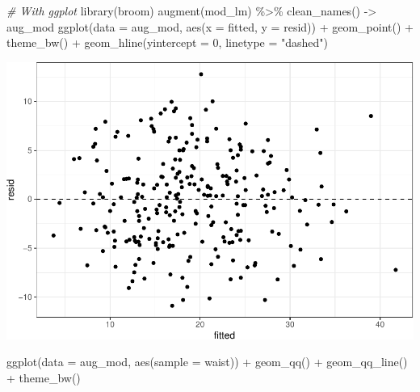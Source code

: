 \documentclass[
]{article}
\newenvironment{Shaded}{\begin{snugshade}}{\end{snugshade}}
\newcommand{\AttributeTok}[1]{\textcolor[rgb]{0.77,0.63,0.00}{#1}}
\newcommand{\CommentTok}[1]{\textcolor[rgb]{0.56,0.35,0.01}{\textit{#1}}}
\newcommand{\DecValTok}[1]{\textcolor[rgb]{0.00,0.00,0.81}{#1}}
\newcommand{\FunctionTok}[1]{\textcolor[rgb]{0.00,0.00,0.00}{#1}}
\newcommand{\NormalTok}[1]{#1}
\newcommand{\OtherTok}[1]{\textcolor[rgb]{0.56,0.35,0.01}{#1}}
\newcommand{\SpecialCharTok}[1]{\textcolor[rgb]{0.00,0.00,0.00}{#1}}
\newcommand{\StringTok}[1]{\textcolor[rgb]{0.31,0.60,0.02}{#1}}
\begin{document}
\begin{Shaded}
\begin{Highlighting}[]
\CommentTok{\# With ggplot}
\FunctionTok{library}\NormalTok{(broom)}
\FunctionTok{augment}\NormalTok{(mod\_lm) }\SpecialCharTok{\%\textgreater{}\%} 
  \FunctionTok{clean\_names}\NormalTok{() }\OtherTok{{-}\textgreater{}}\NormalTok{ aug\_mod}
\FunctionTok{ggplot}\NormalTok{(}\AttributeTok{data =}\NormalTok{ aug\_mod, }\FunctionTok{aes}\NormalTok{(}\AttributeTok{x =}\NormalTok{ fitted, }\AttributeTok{y =}\NormalTok{ resid)) }\SpecialCharTok{+} 
  \FunctionTok{geom\_point}\NormalTok{() }\SpecialCharTok{+}
  \FunctionTok{theme\_bw}\NormalTok{() }\SpecialCharTok{+} 
  \FunctionTok{geom\_hline}\NormalTok{(}\AttributeTok{yintercept =} \DecValTok{0}\NormalTok{, }\AttributeTok{linetype =} \StringTok{"dashed"}\NormalTok{)}
\end{Highlighting}
\end{Shaded}

\begin{center}\includegraphics{CHAP23_files/figure-latex/unnamed-chunk-4-1} \end{center}

\begin{Shaded}
\begin{Highlighting}[]
\FunctionTok{ggplot}\NormalTok{(}\AttributeTok{data =}\NormalTok{ aug\_mod, }\FunctionTok{aes}\NormalTok{(}\AttributeTok{sample =}\NormalTok{ waist)) }\SpecialCharTok{+} 
  \FunctionTok{geom\_qq}\NormalTok{() }\SpecialCharTok{+}
  \FunctionTok{geom\_qq\_line}\NormalTok{() }\SpecialCharTok{+}
  \FunctionTok{theme\_bw}\NormalTok{() }
\end{Highlighting}
\end{Shaded}
\end{document}
